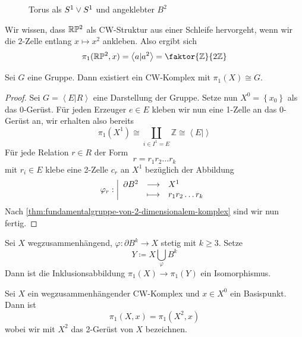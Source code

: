 \begin{figure}[ht]
    \centering
    \caption{Torus als $S^1 \vee S^1$ und angeklebter  $B^2$}
    \label{fig:torus-mit-ausgeschnittener-scheibe}
\end{figure}

\begin{example}
    Wir wissen, dass $\mathbb{R}\mathbb{P}^2$ als CW-Struktur aus einer Schleife hervorgeht, wenn wir die $2$-Zelle entlang  $x \mapsto x^2$ ankleben. Also ergibt sich
    \[
        \pi_1(\R\mathbb{P}^2,x) = \left< a | a^2 \right>  = \faktor{\mathbb{Z}}{2\mathbb{Z}}
    \] 
\end{example}

\begin{corollary}
    Sei $G$ eine Gruppe. Dann existiert ein CW-Komplex mit  $\pi_1(X) \cong G$.
\end{corollary}

\begin{proof}
    Sei $G = \left< E | R \right> $ eine Darstellung der Gruppe. Setze nun $X^0 = \left \{x_0\right\} $ als das 0-Gerüst. Für jeden Erzeuger $e\in E$ kleben wir nun eine 1-Zelle an das 0-Gerüst an, wir erhalten also bereits
    \[
        \pi_1(X^1) \cong \coprod _{i \in I^1 = E} \mathbb{Z} \cong \left< E |  \right> 
    \] 
    Für jede Relation $r\in R$ der Form
    \[
    r = r_1r_2\ldots r_k
    \] 
    mit $r_i \in E$ klebe eine 2-Zelle $c_r$ an  $X^1$ bezüglich der Abbildung
        \begin{equation*}
        \varphi_r: \left| \begin{array}{c c l} 
        \partial B^2 & \longrightarrow & X^1 \\
         & \longmapsto &  r_1r_2\ldots r_k
        \end{array} \right.
    \end{equation*}
    Nach \autoref{thm:fundamentalgruppe-von-2-dimensionalem-komplex} sind wir nun fertig.
\end{proof}

\begin{theorem}
    Sei $X$ wegzusammenhängend,  $\varphi\colon  \partial B^k \to  X$ stetig mit $k\geq 3$. Setze
    \[
    Y \coloneqq  X \bigcup_{\varphi} B^k
    \] 
    Dann ist die Inklusionsabbildung $\pi_1(X) \to  \pi_1(Y)$ ein Isomorphismus.
\end{theorem}

\begin{corollary}
    Sei $X$ ein wegzusammenhängender CW-Komplex und  $x\in X^0$ ein Basispunkt. Dann ist
    \[
        \pi_1(X, x) = \pi_1(X^2,x)
    \] 
    wobei wir mit $X^2$ das 2-Gerüst von $X$ bezeichnen.
\end{corollary}

